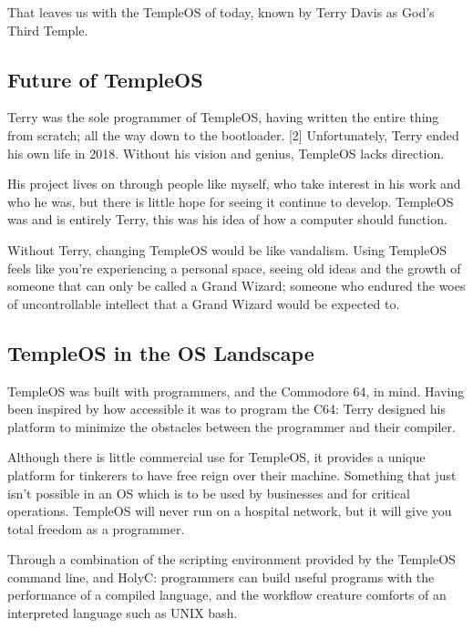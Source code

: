\documentclass[11pt]{article}
\begin{document}
That leaves us with the TempleOS of today, known by Terry Davis as God's
Third Temple.

 \newpage

\subsection{Future of TempleOS}
\label{sec:org0244aca}

Terry was the sole programmer of TempleOS, having written the entire thing from
scratch; all the way down to the bootloader. [2] Unfortunately, Terry ended his
own life in 2018. Without his vision and genius, TempleOS lacks direction.

His project lives on through people like myself, who take interest in his work
and who he was, but there is little hope for seeing it continue to develop.
TempleOS was and is entirely Terry, this was his idea of how a computer should
function.

Without Terry, changing TempleOS would be like vandalism. Using TempleOS feels
like you're experiencing a personal space, seeing old ideas and the growth of
someone that can only be called a Grand Wizard; someone who endured the woes of
uncontrollable intellect that a Grand Wizard would be expected to.

\subsection{TempleOS in the OS Landscape}
\label{sec:org5a93275}

TempleOS was built with programmers, and the Commodore 64, in mind. Having been
inspired by how accessible it was to program the C64: Terry designed his
platform to minimize the obstacles between the programmer and their compiler.

Although there is little commercial use for TempleOS, it provides a unique
platform for tinkerers to have free reign over their machine. Something that
just isn't possible in an OS which is to be used by businesses and for critical
operations. TempleOS will never run on a hospital network, but it will give you
total freedom as a programmer.

Through a combination of the scripting environment provided by the TempleOS
command line, and HolyC: programmers can build useful programs with the
performance of a compiled language, and the workflow creature comforts of an
interpreted language such as UNIX bash.

 \newpage
\end{document}
